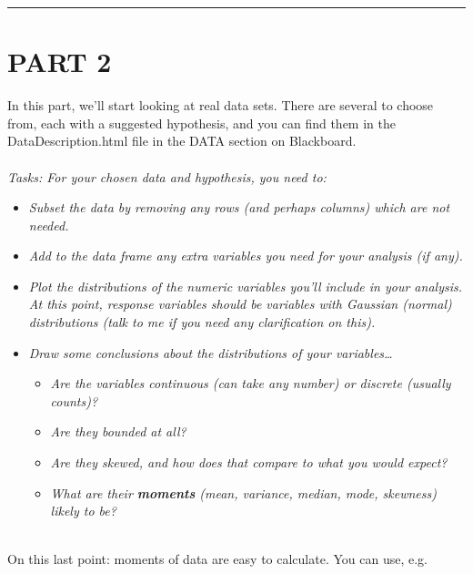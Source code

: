 \documentclass[
]{book}
\newenvironment{Shaded}{\begin{snugshade}}{\end{snugshade}}
\newcommand{\CommentTok}[1]{\textcolor[rgb]{0.56,0.35,0.01}{\textit{#1}}}
\newcommand{\KeywordTok}[1]{\textcolor[rgb]{0.13,0.29,0.53}{\textbf{#1}}}
\newcommand{\NormalTok}[1]{#1}
\newcommand{\OperatorTok}[1]{\textcolor[rgb]{0.81,0.36,0.00}{\textbf{#1}}}
\newcommand{\StringTok}[1]{\textcolor[rgb]{0.31,0.60,0.02}{#1}}
\providecommand{\tightlist}{%
  \setlength{\itemsep}{0pt}\setlength{\parskip}{0pt}}
\begin{document}
\begin{center}\rule{0.5\linewidth}{0.5pt}\end{center}

\hypertarget{part-2}{%
\section{PART 2}\label{part-2}}

In this part, we'll start looking at real data sets. There are several
to choose from, each with a suggested hypothesis, and you can find them in the
DataDescription.html file in the DATA section on Blackboard.\\
~\\

\emph{Tasks: For your chosen data and hypothesis, you need to:}

\begin{itemize}
\tightlist
\item
  \emph{Subset the data by removing any rows (and perhaps columns) which are not
  needed.}
\item
  \emph{Add to the data frame any extra variables you need for your analysis (if any).}
\item
  \emph{Plot the distributions of the numeric variables you'll include in your
  analysis. At this point, response variables should be variables with Gaussian (normal) distributions (talk to me if you need any clarification on this).}
\item
  \emph{Draw some conclusions about the distributions of your variables\ldots{}}

  \begin{itemize}
  \tightlist
  \item
    \emph{Are the variables continuous (can take any number) or discrete (usually counts)?}
  \item
    \emph{Are they bounded at all?}
  \item
    \emph{Are they skewed, and how does that compare to what you would expect?}
  \item
    \emph{What are their \textbf{moments} (mean, variance, median, mode, skewness) likely to be?}\\
    ~\\
  \end{itemize}
\end{itemize}

On this last point: moments of data are easy to calculate. You can use, e.g.

\begin{Shaded}
\end{Shaded}
\end{document}
